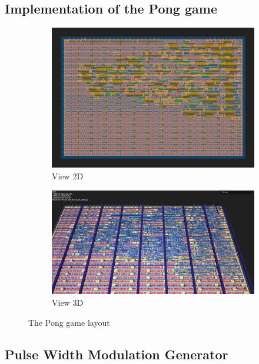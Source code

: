 \subsection{Implementation of the Pong game}

\begin{figure}[H]
    \centering
    \begin{subfigure}[b]{0.45\textwidth}
        \includegraphics[width=\linewidth]{Pictures/Result_Pong_2D_View.png}
        \caption{View 2D}\label{fig:pong_2D}
    \end{subfigure}
    \begin{subfigure}[b]{0.45\textwidth}
        \includegraphics[width=\linewidth]{Pictures/Result_Pong_3D_View.png}
        \caption{View 3D}\label{fig:pong_3D}
    \end{subfigure}
    \caption{The Pong game layout}\label{fig:Pong_Layout}
\end{figure}

\subsection{Pulse Width Modulation Generator}

